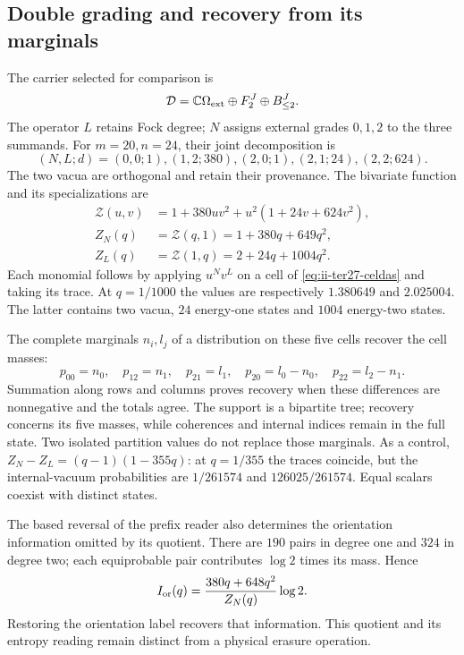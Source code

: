 \subsection{Double grading and recovery from its marginals}
\label{sec:ii-ter27-doble}

The carrier selected for comparison is
\[
 \mathcal D=\mathbb C\Omega_{\rm ext}\oplus F_2^J\oplus B_{\leq2}^J.
\]
The operator $L$ retains Fock degree; $N$ assigns external grades
$0,1,2$ to the three summands. For $m=20,n=24$, their joint
decomposition is
\begin{equation}
 (N,L;d)=(0,0;1),(1,2;380),(2,0;1),(2,1;24),(2,2;624).
 \label{eq:ii-ter27-celdas}
\end{equation}
The two vacua are orthogonal and retain their provenance. The bivariate
function and its specializations are
\begin{align}
 \mathcal Z(u,v)&=1+380uv^2+u^2(1+24v+624v^2),\\
 Z_N(q)&=\mathcal Z(q,1)=1+380q+649q^2,\\
 Z_L(q)&=\mathcal Z(1,q)=2+24q+1004q^2.
 \label{eq:ii-ter27-particiones}
\end{align}
Each monomial follows by applying $u^Nv^L$ on a cell of
\eqref{eq:ii-ter27-celdas} and taking its trace. At $q=1/1000$ the
values are respectively $1.380649$ and $2.025004$. The latter contains
two vacua, $24$ energy-one states and $1004$ energy-two states.

The complete marginals $n_i,l_j$ of a distribution on these five cells
recover the cell masses:
\[
 p_{00}=n_0,\quad p_{12}=n_1,\quad p_{21}=l_1,
 \quad p_{20}=l_0-n_0,\quad p_{22}=l_2-n_1.
\]
Summation along rows and columns proves recovery when these differences
are nonnegative and the totals agree. The support is a bipartite tree;
recovery concerns its five masses, while coherences and internal indices
remain in the full state. Two isolated partition values do not replace
those marginals. As a control, $Z_N-Z_L=(q-1)(1-355q)$: at $q=1/355$
the traces coincide, but the internal-vacuum probabilities are
$1/261574$ and $126025/261574$. Equal scalars coexist with distinct states.

The based reversal of the prefix reader also determines the orientation
information omitted by its quotient. There are $190$ pairs in degree
one and $324$ in degree two; each equiprobable pair contributes $\log2$
times its mass. Hence
\[
 I_{\rm or}(q)=\frac{380q+648q^2}{Z_N(q)}\log2.
\]
Restoring the orientation label recovers that information. This quotient
and its entropy reading remain distinct from a physical erasure operation.

